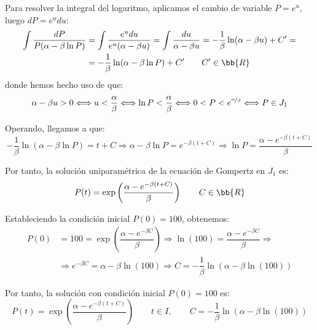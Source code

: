 \begin{ejercicio}
\begin{itemize}
        Para resolver la integral del logaritmo, aplicamos el cambio de variable $P=e^u$, luego $dP=e^u du$:
        \begin{align*}
            \int \dfrac{dP}{P(\alpha - \beta \ln P)} &= \int \dfrac{e^u du}{e^u(\alpha - \beta u)} = \int \dfrac{du}{\alpha - \beta u}
            = -\dfrac{1}{\beta} \ln(\alpha - \beta u) + C' =\\
            &= -\dfrac{1}{\beta} \ln(\alpha - \beta \ln P) + C' \qquad C'\in \bb{R}
        \end{align*}
        donde hemos hecho uso de que:
        \begin{equation*}
            \alpha-\beta u>0\Longleftrightarrow
            u<\dfrac{\alpha}{\beta}\Longleftrightarrow
            \ln P<\dfrac{\alpha}{\beta}\Longleftrightarrow
            0<P<e^{\nicefrac{\alpha}{\beta}} \Longleftrightarrow P\in J_1
        \end{equation*}

        Operando, llegamos a que:
        \begin{equation*}
            -\dfrac{1}{\beta} \ln(\alpha - \beta \ln P) = t + C \Longrightarrow \alpha - \beta \ln P = e^{-\beta(t + C)} \Longrightarrow \ln P = \dfrac{\alpha - e^{-\beta(t + C)}}{\beta}
        \end{equation*}

        Por tanto, la solución uniparamétrica de la ecuación de Gompertz en $J_1$ es:
        \begin{equation*}
            P(t) = \exp\left(\dfrac{\alpha - e^{-\beta(t + C)}}{\beta}\right) \qquad C\in \bb{R}
        \end{equation*}

        Estableciendo la condición inicial $P(0)=100$, obtenemos:
        \begin{align*}
            P(0) &= 100 = \exp\left(\dfrac{\alpha - e^{-\beta C}}{\beta}\right) \Longrightarrow \ln(100) = \dfrac{\alpha - e^{-\beta C}}{\beta} \Longrightarrow \\ &\Longrightarrow e^{-\beta C} = \alpha-\beta\ln(100) \Longrightarrow C=-\dfrac{1}{\beta}\ln(\alpha-\beta\ln(100))
        \end{align*}

        Por tanto, la solución con condición inicial $P(0)=100$ es:
        \begin{equation*}
            P(t) = \exp\left(\dfrac{\alpha - e^{-\beta(t +C)}}{\beta}\right) \qquad t\in I, \qquad C=-\dfrac{1}{\beta}\ln(\alpha-\beta\ln(100))
        \end{equation*}


\end{itemize}
\end{ejercicio}
